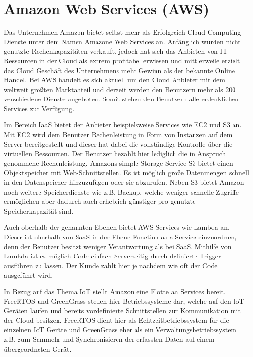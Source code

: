 \chapter{Amazon Web Services (AWS)}\label{ch:4}

Das Unternehmen Amazon bietet selbst mehr als Erfolgreich Cloud Computing Dienste unter dem Namen Amazone Web Services an. Anfänglich wurden nicht genutzte Rechenkapazitäten verkauft, jedoch hat sich das Anbieten von IT-Ressourcen in der Cloud als extrem profitabel erwiesen und mittlerweile erzielt das Cloud Geschäft des Unternehmens mehr Gewinn als der bekannte Online Handel. Bei AWS handelt es sich aktuell um den Cloud Anbieter mit dem weltweit größten Marktanteil und derzeit werden den Benutzern mehr als 200 verschiedene Dienste angeboten. Somit stehen den Benutzern alle erdenklichen Services zur Verfügung\cite*[]{AMA1}.

Im Bereich IaaS bietet der Anbieter beispielsweise Services wie EC2 und S3 an. Mit EC2 wird dem Benutzer Rechenleistung in Form von Instanzen auf dem Server bereitgestellt und dieser hat dabei die vollständige Kontrolle über die virtuellen Ressourcen. Der Benutzer bezahlt hier lediglich die in Anspruch genommene Rechenleistung. Amazons simple Storage Service S3 bietet einen Objektspeicher mit Web-Schnittstellen. Es ist möglich große Datenmengen schnell in den Datenspeicher hinzuzufügen oder sie abzurufen. Neben S3 bietet Amazon noch weitere Speicherdienste wie z.B. Backup, welche weniger schnelle Zugriffe ermöglichen aber dadurch auch erheblich günstiger pro genutzte Speicherkapazität sind. \cite*[]{ÜAWS}

Auch oberhalb der genannten Ebenen bietet AWS Services wie Lambda an. Dieser ist oberhalb von SaaS in der Ebene Function as a Service einzuordnen, denn der Benutzer besitzt weniger Verantwortung als bei SaaS. Mithilfe von Lambda ist es möglich Code einfach Serverseitig durch definierte Trigger ausführen zu lassen. Der Kunde zahlt hier je nachdem wie oft der Code ausgeführt wird. \cite*[]{ÜAWS}

In Bezug auf das Thema IoT stellt Amazon eine Flotte an Services bereit. FreeRTOS und GreenGrass stellen hier Betriebssysteme dar, welche auf den IoT Geräten laufen und bereits vordefinierte Schnittstellen zur Kommunikation mit der Cloud besitzen. FreeRTOS dient hier als Echtzeitbetriebssystem für die einzelnen IoT Geräte und GreenGrass eher als ein Verwaltungsbetriebssystem z.B. zum Sammeln und Synchronisieren der erfassten Daten auf einem übergeordneten Gerät. \cite*[]{ÜAWS}

